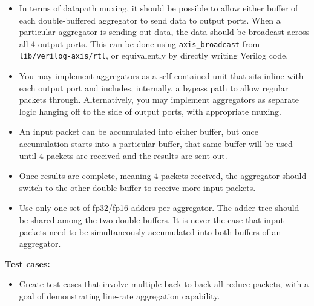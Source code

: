 \begin{tcolorbox}[
	colback=white,
	colframe=black,
	coltext=vrkblue,
	breakable,
	fontupper={\scriptsize\fontfamily{pcr}\selectfont},
	before upper={\RaggedRight}
	]
\begin{itemize}[leftmargin=*, topsep=2pt, itemsep=1pt]
		\item In terms of datapath muxing, it should be possible to allow either buffer of each double-buffered aggregator to send data to output ports. When a particular aggregator is sending out data, the data should be broadcast across all 4 output ports. This can be done using \texttt{axis\_broadcast} from \texttt{lib/verilog-axis/rtl}, or equivalently by directly writing Verilog code.
		
		\item You may implement aggregators as a self-contained unit that sits inline with each output port and includes, internally, a bypass path to allow regular packets through. Alternatively, you may implement aggregators as separate logic hanging off to the side of output ports, with appropriate muxing.
		
		\item An input packet can be accumulated into either buffer, but once accumulation starts into a particular buffer, that same buffer will be used until 4 packets are received and the results are sent out.
		
		\item Once results are complete, meaning 4 packets received, the aggregator should switch to the other double-buffer to receive more input packets.
		
		\item Use only one set of fp32/fp16 adders per aggregator. The adder tree should be shared among the two double-buffers. It is never the case that input packets need to be simultaneously accumulated into both buffers of an aggregator.
	\end{itemize}
	
	\par\smallskip
	\textbf{Test cases:}
	
	\begin{itemize}[leftmargin=*, topsep=2pt, itemsep=1pt]
		\item Create test cases that involve multiple back-to-back all-reduce packets, with a goal of demonstrating line-rate aggregation capability.
	\end{itemize}
\end{tcolorbox}


